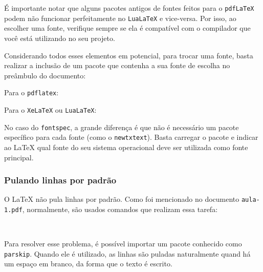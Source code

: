 \documentclass{article}
\begin{document}
É importante notar que alguns pacotes antigos de fontes feitos para o \texttt{pdfLaTeX} podem não funcionar perfeitamente no \texttt{LuaLaTeX} e vice-versa. Por isso, ao escolher uma fonte, verifique sempre se ela é compatível com o compilador que você está utilizando no seu projeto.

Considerando todos esses elementos em potencial, para trocar uma fonte, basta realizar a inclusão de um pacote que contenha a sua fonte de escolha no preâmbulo do documento:

Para o \texttt{pdflatex}: 

\begin{teX} 
	\usepackage[T1]{fontenc} %
	\usepackage{newtxtext}%
\end{teX}

Para o \texttt{XeLaTeX} ou \texttt{LuaLaTeX}:

\begin{teX} 
	\usepackage{fontspec} 
	\setmainfont{Arial} %
\end{teX}

No caso do \texttt{fontspec}, a grande diferença é que não é necessário um pacote específico para cada fonte (como o \texttt{newtxtext}). Basta carregar o pacote e indicar ao \LaTeX\hspace{1pt} qual fonte do seu sistema operacional deve ser utilizada como fonte principal.

\subsubsection{Pulando linhas por padrão}
O \LaTeX\hspace{1pt} não pula linhas por padrão. Como foi mencionado no documento \texttt{aula-1.pdf}, normalmente, são usados comandos que realizam essa tarefa:

\begin{teX}
	\\ %
	\newline %
\end{teX}

Para resolver esse problema, é possível importar um pacote conhecido como \texttt{parskip}. Quando ele é utilizado, as linhas são puladas naturalmente quand há um espaço em branco, da forma que o texto é escrito.
\end{document}
